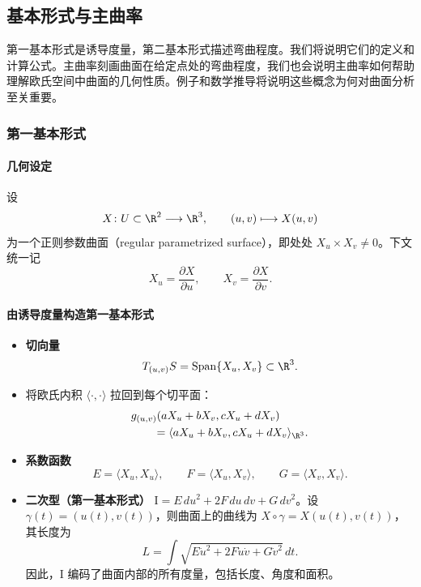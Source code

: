 \subsection{基本形式与主曲率}
第一基本形式是诱导度量，第二基本形式描述弯曲程度。我们将说明它们的定义和计算公式。主曲率刻画曲面在给定点处的弯曲程度，我们也会说明主曲率如何帮助理解欧氏空间中曲面的几何性质。例子和数学推导将说明这些概念为何对曲面分析至关重要。

\subsubsection{第一基本形式}
\paragraph{几何设定}
设
\[
  X\colon U\subset\R^2\longrightarrow\R^3,\qquad
  (u,v)\longmapsto X(u,v)
\]
为一个正则参数曲面（regular parametrized surface），即处处 $X_u\times X_v\ne0$。下文统一记
\[
  X_u=\frac{\partial X}{\partial u},\qquad X_v=\frac{\partial X}{\partial v}.
\]

\paragraph{由诱导度量构造第一基本形式}
\begin{itemize}
  \item \textbf{切向量}
  \[
    T_{(u,v)}S=\operatorname{Span}\{X_u,X_v\}\subset\R^3.
  \]
  \item 将欧氏内积 $\langle\cdot,\cdot\rangle$ 拉回到每个切平面：
  \[
    \begin{aligned}
      &g_{(u,v)}(aX_u+bX_v,cX_u+dX_v)\\
      &\qquad=\langle aX_u+bX_v,cX_u+dX_v\rangle_{\R^3}.
    \end{aligned}
  \]
  \item \textbf{系数函数}
  \[
    E=\langle X_u,X_u\rangle,\qquad
    F=\langle X_u,X_v\rangle,\qquad
    G=\langle X_v,X_v\rangle.
  \]
  \item \textbf{二次型（第一基本形式）}\quad
  $\mathrm I=E\,du^2+2F\,du\,dv+G\,dv^2$。设 $\gamma(t)=(u(t),v(t))$，则曲面上的曲线为 $X\circ\gamma=X(u(t),v(t))$，其长度为
  \begin{equation*}
    L=\int\sqrt{E\dot u^2+2F\dot u\dot v+G\dot v^2}\,dt.
    \tag{5.5}\label{eq:5.5}
  \end{equation*}
  因此，$\mathrm I$ 编码了曲面内部的所有度量，包括长度、角度和面积。
\end{itemize}

